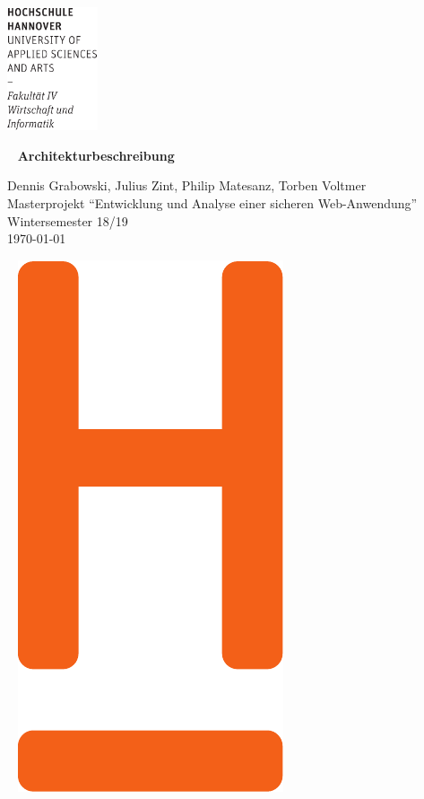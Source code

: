 \documentclass[12pt,DIV14,BCOR10mm,a4paper,parskip=half-,headsepline,headinclude,english,ngerman,bibliography=totocnumbered]{scrreprt}
\begin{document}
  \thispagestyle{empty} %
\includegraphics[width=0.2\textwidth]{Wortmarke_WI_schwarz}

   {  ~ \sffamily
  \vfill
  {\Huge\bfseries Architekturbeschreibung}
  \bigskip

  {\Large
  Dennis Grabowski, Julius Zint, Philip Matesanz, Torben Voltmer \\[2ex]
  Masterprojekt \enquote{Entwicklung und Analyse einer sicheren Web-Anwendung} \\
  Wintersemester 18/19
 \\[5ex]
   \today }
}
 \vfill

  ~ \hfill
  \includegraphics[height=0.3\paperheight]{H_WI_Pantone1665}

\vspace*{-3cm}
\end{document}
